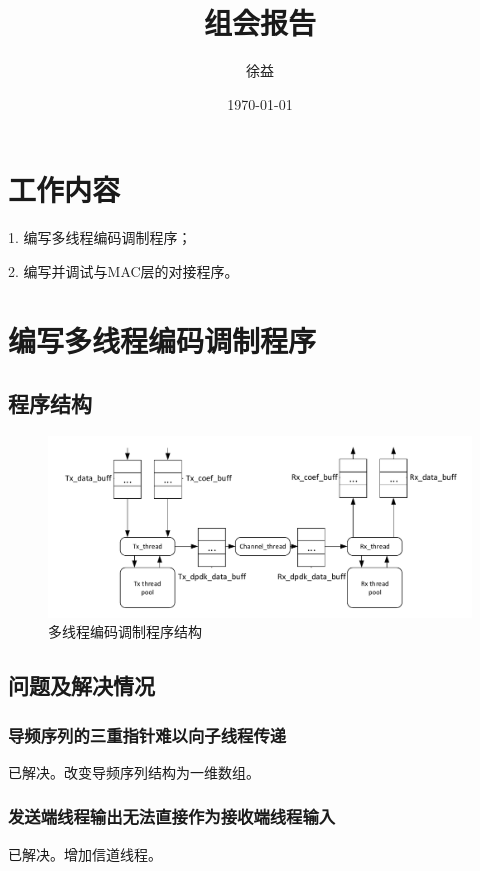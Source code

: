 \documentclass{article}
\title{组会报告}
\author{徐益}
\date{\today}
\begin{document}
\maketitle


\section{工作内容} 
1. 编写多线程编码调制程序；

2. 编写并调试与MAC层的对接程序。

\section{编写多线程编码调制程序}
\subsection{程序结构}
\begin{figure}[H]
	\centering
	\includegraphics[width = \textwidth]{multi.pdf}
	\caption{多线程编码调制程序结构}
\end{figure}

\subsection{问题及解决情况}
\subsubsection{导频序列的三重指针难以向子线程传递}
已解决。改变导频序列结构为一维数组。
\subsubsection{发送端线程输出无法直接作为接收端线程输入}
已解决。增加信道线程。
\end{document}
